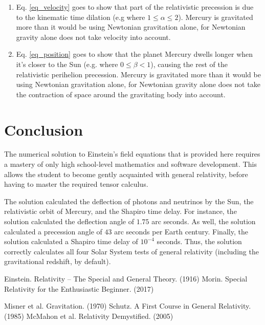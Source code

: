 \documentclass[12pt]{article}
\begin{document}
\begin{enumerate}
\item
Eq. \ref{eq_velocity} goes to show that part of the relativistic precession is due to the kinematic time dilation (e.g where $1 \leq \alpha \leq 2$). 
Mercury is gravitated more than it would be using Newtonian gravitation alone, for Newtonian gravity alone does not take velocity into account.

\item
Eq. \ref{eq_position} goes to show that the planet Mercury dwells longer when it's closer to the Sun (e.g. where $0 \leq \beta < 1$), causing the rest of the relativistic perihelion precession. 
Mercury is gravitated more than it would be using Newtonian gravitation alone, for Newtonian gravity alone does not take the contraction of space around the gravitating body into account.



\end{enumerate}


\section{Conclusion}

The numerical solution to Einstein's field equations that is provided here requires a mastery of only high school-level mathematics and software development.
This allows the student to become gently acquainted with general relativity, before having to master the required tensor calculus.

The solution calculated the deflection of photons and neutrinos by the Sun, the relativistic orbit of Mercury, and the Shapiro time delay.
For instance, the solution calculated the deflection angle of $1.75$ arc seconds.
As well, the solution calculated a precession angle of $43$ arc seconds per Earth century.
Finally, the solution calculated a Shapiro time delay of $10^{-4}$ seconds.
Thus, the solution correctly calculates all four Solar System tests of general relativity (including the gravitational redshift, by default).







\begin{thebibliography}{9}


 Einstein. Relativity -- The Special and General Theory. (1916)
 Morin. Special Relativity for the Enthusiastic Beginner. (2017)

 Misner et al. Gravitation. (1970)
 Schutz. A First Course in General Relativity. (1985)
 McMahon et al. Relativity Demystified. (2005)

\end{thebibliography}
\end{document}
